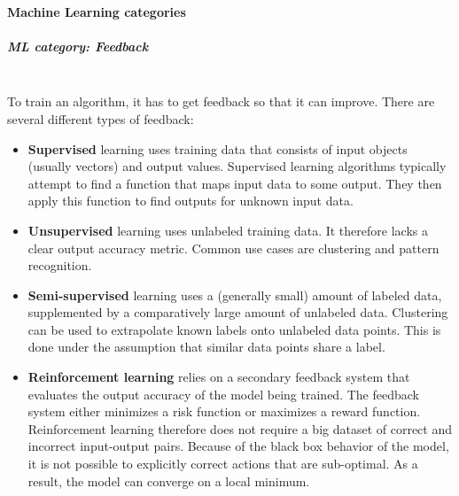 \paragraph{Machine Learning categories}
\subparagraph{ML category: Feedback}\mbox{}\\
To train an algorithm, it has to get feedback so that it can improve. There are several different types of feedback:\cite{DBLP:journals/corr/YogatamaBDGL16}
\begin{itemize}
	\item \textbf{Supervised}
		learning uses training data that consists of input objects (usually vectors) and output values. Supervised learning algorithms typically attempt to find a function that maps input data to some output. They then apply this function to find outputs for unknown input data.
	\item \textbf{Unsupervised}
		learning uses unlabeled training data. It therefore lacks a clear output accuracy metric. Common use cases are clustering and pattern recognition.
	\item \textbf{Semi-supervised}
		learning uses a (generally small) amount of labeled data, supplemented by a comparatively large amount of unlabeled data. Clustering can be used to extrapolate known labels onto unlabeled data points. This is done under the assumption that similar data points share a label.
	\item \textbf{Reinforcement learning}
		relies on a secondary feedback system that evaluates the output accuracy of the model being trained. The feedback system either minimizes a risk function or maximizes a reward function. Reinforcement learning therefore does not require a big dataset of correct and incorrect input-output pairs. Because of the black box behavior of the model, it is not possible to explicitly correct actions that are sub-optimal. As a result, the model can converge on a local minimum.
\end{itemize}

